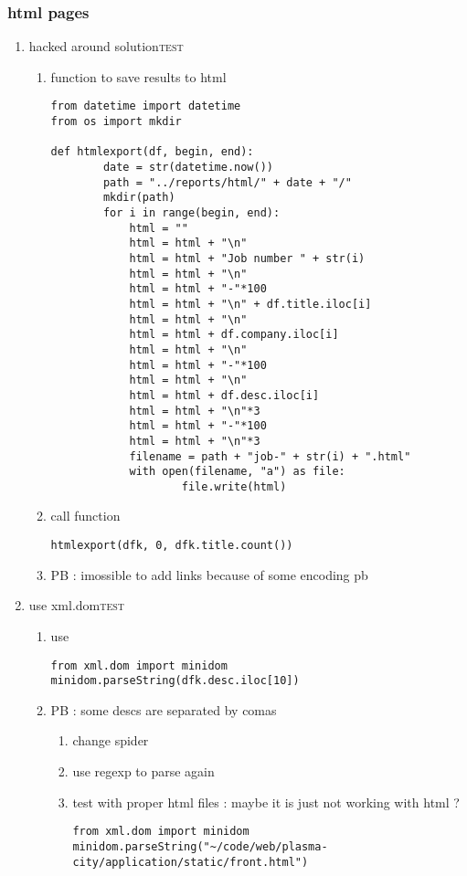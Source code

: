 \documentclass[11pt]{article}
\begin{document}
\subsubsection{html pages}
\label{sec:org317e9cb}
\begin{enumerate}
\item hacked around solution\hfill{}\textsc{test}
\label{sec:org931eb2b}
\begin{enumerate}
\item function to save results to html
\label{sec:orgca488ef}
\begin{verbatim}
from datetime import datetime
from os import mkdir

def htmlexport(df, begin, end):
	    date = str(datetime.now())
	    path = "../reports/html/" + date + "/"
	    mkdir(path)
	    for i in range(begin, end):
			html = ""
			html = html + "\n"
			html = html + "Job number " + str(i)
			html = html + "\n"
			html = html + "-"*100
			html = html + "\n" + df.title.iloc[i]
			html = html + "\n"
			html = html + df.company.iloc[i]
			html = html + "\n"
			html = html + "-"*100
			html = html + "\n"
			html = html + df.desc.iloc[i]
			html = html + "\n"*3
			html = html + "-"*100
			html = html + "\n"*3
			filename = path + "job-" + str(i) + ".html"
			with open(filename, "a") as file:
				    file.write(html)
\end{verbatim}

\item call function
\label{sec:org544b486}
\begin{verbatim}
htmlexport(dfk, 0, dfk.title.count())
\end{verbatim}
\item PB : imossible to add links because of some encoding pb
\label{sec:org267f263}
\end{enumerate}
\item use xml.dom\hfill{}\textsc{test}
\label{sec:orga5b9486}
\begin{enumerate}
\item use
\label{sec:org90e8503}
\begin{verbatim}
from xml.dom import minidom
minidom.parseString(dfk.desc.iloc[10])
\end{verbatim}

\item PB : some descs are separated by comas
\label{sec:org1cc5ebc}
\begin{enumerate}
\item change spider
\label{sec:orgb170fd3}
\item use regexp to parse again
\label{sec:org6fdc097}
\item test with proper html files : maybe it is just not working with html ?
\label{sec:org3496d50}
\begin{verbatim}
from xml.dom import minidom
minidom.parseString("~/code/web/plasma-city/application/static/front.html")
\end{verbatim}
\end{enumerate}
\end{enumerate}


\end{enumerate}
\end{document}
